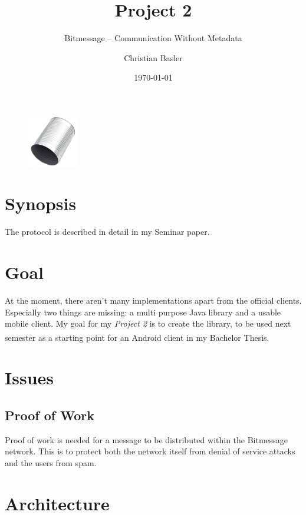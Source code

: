 \documentclass{bfh}
\title{Project 2}
\subtitle{Bitmessage -- Communication Without Metadata}
\author{Christian Basler}
\date{\today}
\begin{document}
  \maketitle

\begin{figure}[h]
\includegraphics[width=0.2\textwidth]{logo.png}
\centering
\end{figure}

  \tableofcontents

  \section{Synopsis}



  

  The protocol is described in detail in my Seminar paper.


  \section{Goal}

  At the moment, there aren't many implementations apart from the official clients. Especially two things are missing: a multi purpose Java library and a usable mobile client. My goal for my \textit{Project 2} is to create the library, to be used next semester as a starting point for an Android\textsuperscript{\texttrademark} client in my Bachelor Thesis.


  \section{Issues}

  \subsection{Proof of Work}

  Proof of work is needed for a message to be distributed within the Bitmessage network. This is to protect both the network itself from denial of service attacks and the users from spam.


  \section{Architecture}
\end{document}
